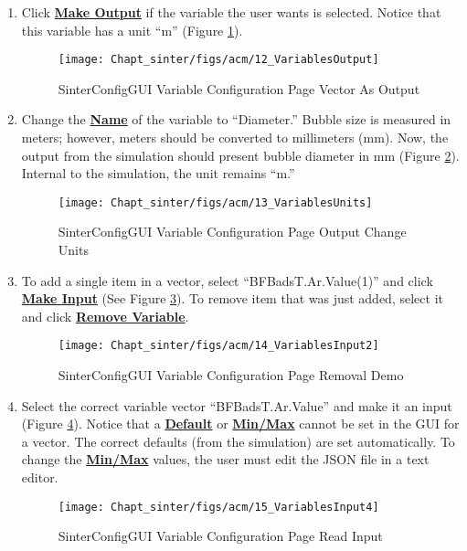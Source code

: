 \begin{enumerate}
\item Click \textbf{\underline{Make Output}} if the variable the user wants is selected. Notice that this variable has a unit ``m'' (Figure \ref{fig.sinter.acm.vectoroutput}). 
\begin{figure}[H]
	\begin{center}
		\texttt{[image: Chapt\_sinter/figs/acm/12\_VariablesOutput]}
		\caption{SinterConfigGUI Variable Configuration Page Vector As Output}
		\label{fig.sinter.acm.vectoroutput}
	\end{center}
\end{figure}

\item Change the \textbf{\underline{Name}} of the variable to ``Diameter.'' Bubble size is measured in meters; however, meters should be converted to millimeters (mm). Now, the output from the simulation should present bubble diameter in mm (Figure \ref{fig.sinter.acm.vectorunits}).  Internal to the simulation, the unit remains ``m.''
\begin{figure}[H]
	\begin{center}
		\texttt{[image: Chapt\_sinter/figs/acm/13\_VariablesUnits]}
		\caption{SinterConfigGUI Variable Configuration Page Output Change Units}
		\label{fig.sinter.acm.vectorunits}
	\end{center}
\end{figure}

\item To add a single item in a vector, select ``BFBadsT.Ar.Value(1)''
  and click \textbf{\underline{Make Input}} (See Figure
  \ref{fig.sinter.acm.vectorremoval}). To remove item that was just added, select it and click \textbf{\underline{Remove Variable}}.
\begin{figure}[H]
	\begin{center}
		\texttt{[image: Chapt\_sinter/figs/acm/14\_VariablesInput2]}
		\caption{SinterConfigGUI Variable Configuration Page Removal Demo}
		\label{fig.sinter.acm.vectorremoval}
	\end{center}
\end{figure}
\item Select the correct variable vector ``BFBadsT.Ar.Value'' and make it an input (Figure \ref{fig.sinter.acm.vectorreadd}). Notice that a \textbf{\underline{Default}} or \textbf{\underline{Min/Max}} cannot be set in the GUI for a vector. The correct defaults (from the simulation) are set automatically. To change the \textbf{\underline{Min/Max}} values, the user must edit the JSON file in a text editor.
\begin{figure}[H]
	\begin{center}
		\texttt{[image: Chapt\_sinter/figs/acm/15\_VariablesInput4]}
		\caption{SinterConfigGUI Variable Configuration Page Read Input}
		\label{fig.sinter.acm.vectorreadd}
	\end{center}
\end{figure}


\end{enumerate}

